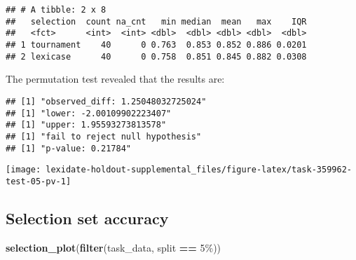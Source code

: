 \documentclass[
]{book}
\newenvironment{Shaded}{\begin{snugshade}}{\end{snugshade}}
\newcommand{\AttributeTok}[1]{\textcolor[rgb]{0.13,0.29,0.53}{#1}}
\newcommand{\DecValTok}[1]{\textcolor[rgb]{0.00,0.00,0.81}{#1}}
\newcommand{\FunctionTok}[1]{\textcolor[rgb]{0.13,0.29,0.53}{\textbf{#1}}}
\newcommand{\NormalTok}[1]{#1}
\newcommand{\OtherTok}[1]{\textcolor[rgb]{0.56,0.35,0.01}{#1}}
\newcommand{\SpecialCharTok}[1]{\textcolor[rgb]{0.81,0.36,0.00}{\textbf{#1}}}
\newcommand{\StringTok}[1]{\textcolor[rgb]{0.31,0.60,0.02}{#1}}
\begin{document}
\begin{verbatim}
## # A tibble: 2 x 8
##   selection  count na_cnt   min median  mean   max    IQR
##   <fct>      <int>  <int> <dbl>  <dbl> <dbl> <dbl>  <dbl>
## 1 tournament    40      0 0.763  0.853 0.852 0.886 0.0201
## 2 lexicase      40      0 0.758  0.851 0.845 0.882 0.0308
\end{verbatim}

The permutation test revealed that the results are:

\begin{Shaded}
\end{Shaded}

\begin{verbatim}
## [1] "observed_diff: 1.25048032725024"
## [1] "lower: -2.00109902223407"
## [1] "upper: 1.95593273813578"
## [1] "fail to reject null hypothesis"
## [1] "p-value: 0.21784"
\end{verbatim}

\texttt{[image: lexidate-holdout-supplemental\_files/figure-latex/task-359962-test-05-pv-1]}

\hypertarget{selection-set-accuracy-55}{%
\subsection{Selection set accuracy}\label{selection-set-accuracy-55}}

\begin{Shaded}
\begin{Highlighting}[]
\FunctionTok{selection\_plot}\NormalTok{(}\FunctionTok{filter}\NormalTok{(task\_data, split }\SpecialCharTok{==} \StringTok{\textquotesingle{}5\%\textquotesingle{}}\NormalTok{))}
\end{Highlighting}
\end{Shaded}
\end{document}
